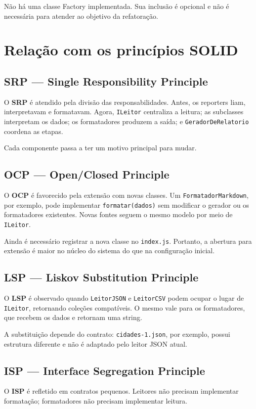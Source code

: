 \documentclass[12pt,a4paper]{article}
\begin{document}
Não há uma classe Factory implementada. Sua inclusão é opcional e não é necessária para atender ao objetivo da refatoração.

\section{Relação com os princípios SOLID}


\subsection{SRP --- Single Responsibility Principle}
O \textbf{SRP} é atendido pela divisão das responsabilidades. Antes, os reporters liam, interpretavam e formatavam. Agora, \texttt{ILeitor} centraliza a leitura; as subclasses interpretam os dados; os formatadores produzem a saída; e \texttt{GeradorDeRelatorio} coordena as etapas.

Cada componente passa a ter um motivo principal para mudar.

\subsection{OCP --- Open/Closed Principle}
O \textbf{OCP} é favorecido pela extensão com novas classes. Um \texttt{FormatadorMarkdown}, por exemplo, pode implementar \texttt{formatar(dados)} sem modificar o gerador ou os formatadores existentes. Novas fontes seguem o mesmo modelo por meio de \texttt{ILeitor}.

Ainda é necessário registrar a nova classe no \texttt{index.js}. Portanto, a abertura para extensão é maior no núcleo do sistema do que na configuração inicial.

\subsection{LSP --- Liskov Substitution Principle}
O \textbf{LSP} é observado quando \texttt{LeitorJSON} e \texttt{LeitorCSV} podem ocupar o lugar de \texttt{ILeitor}, retornando coleções compatíveis. O mesmo vale para os formatadores, que recebem os dados e retornam uma string.

A substituição depende do contrato: \texttt{cidades-1.json}, por exemplo, possui estrutura diferente e não é adaptado pelo leitor JSON atual.

\subsection{ISP --- Interface Segregation Principle}
O \textbf{ISP} é refletido em contratos pequenos. Leitores não precisam implementar formatação; formatadores não precisam implementar leitura.
\end{document}
